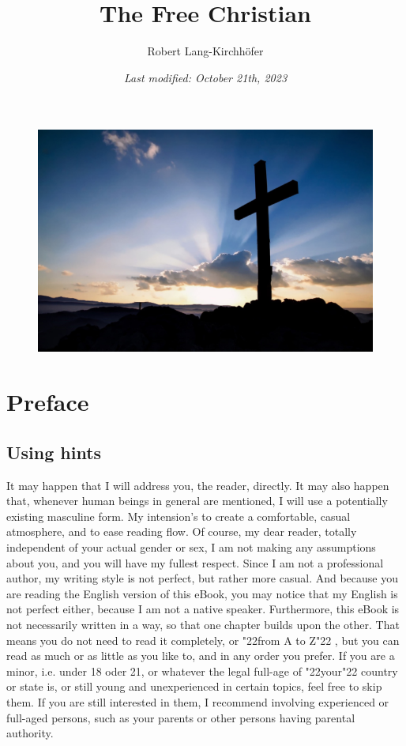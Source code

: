 \documentclass[10pt,a5paper]{article}
\title{\textbf{The Free Christian}}
\author{Robert Lang-Kirchh\"ofer}
\date{\textit{Last modified: October 21th, 2023}}
\newcommand{\q}[1]{\char"22{#1}\char"22 }
\begin{document}
	\setlength{\parindent}{0mm}
	\maketitle
	\begin{figure}[h]
		\centering
		\includegraphics[width=1\textwidth,keepaspectratio]{"FreeChristian.jpeg"}
	\end{figure}

	\newpage
	\tableofcontents

	\newpage
	\section{Preface}

	\subsection{Using hints}
		It may happen that I will address you,
		the reader,
		directly.
		It may also happen that,
		whenever human beings in general are mentioned,
		I will use a potentially existing masculine form.
		My intension's to create a comfortable,
		casual atmosphere,
		and to ease reading flow.
		Of course,
		my dear reader,
		totally independent of your actual gender or sex,
		I am not making any assumptions about you,
		and you will have my fullest respect.
		Since I am not a professional author,
		my writing style is not perfect,
		but rather more casual.
		And because you are reading the English version of this eBook,
		you may notice that my English is not perfect either,
		because I am not a native speaker.
		Furthermore,
		this eBook is not necessarily written in a way,
		so that one chapter builds upon the other.
		That means you do not need to read it completely,
		or \q{from A to Z},
		but you can read as much or as little as you like to,
		and in any order you prefer.
		If you are a minor,
		i.e. under 18 oder 21,
		or whatever the legal full-age of \q{your} country or state is,
		or still young and unexperienced in certain topics,
		feel free to skip them.
		If you are still interested in them,
		I recommend involving experienced or full-aged persons,
		such as your parents or other persons having parental authority.
	
\end{document}
